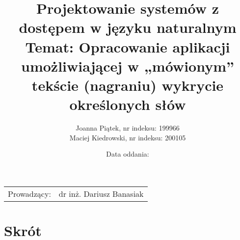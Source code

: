 \documentclass{article}
\title{Projektowanie systemów z dostępem w języku naturalnym\\ Temat: Opracowanie aplikacji umożliwiającej w „mówionym” tekście (nagraniu) wykrycie określonych słów} %
\date{Data oddania: }
\author{Joanna Piątek, nr indeksu: 199966\\
Maciej Kiedrowski, nr indeksu: 200105} %
\begin{document}
\maketitle %

\begin{center}
\begin{tabular}{l r}
Prowadzący: & dr inż. Dariusz Banasiak 

\end{tabular}
\end{center}


\section{Skrót}

 



\end{document}
